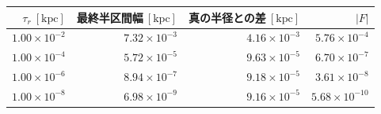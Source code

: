 \begin{tabular}{rrrr}\toprule
$\tau_r\ [\mathrm{kpc}]$ & 最終半区間幅$\ [\mathrm{kpc}]$ & 真の半径との差$\ [\mathrm{kpc}]$ & $|F|$ \\
\midrule
$1.00\times 10^{-2}$ & $7.32\times 10^{-3}$ & $4.16\times 10^{-3}$ & $5.76\times 10^{-4}$ \\
$1.00\times 10^{-4}$ & $5.72\times 10^{-5}$ & $9.63\times 10^{-5}$ & $6.70\times 10^{-7}$ \\
$1.00\times 10^{-6}$ & $8.94\times 10^{-7}$ & $9.18\times 10^{-5}$ & $3.61\times 10^{-8}$ \\
$1.00\times 10^{-8}$ & $6.98\times 10^{-9}$ & $9.16\times 10^{-5}$ & $5.68\times 10^{-10}$ \\
\bottomrule\end{tabular}
